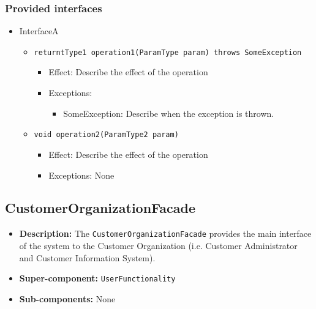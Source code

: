 \documentclass[a4paper,10pt]{article}
\begin{document}
\subsubsection*{Provided interfaces}
\begin{itemize}
    \item InterfaceA
    \begin{itemize}
        \item \texttt{returntType1 operation1(ParamType param) throws SomeException}
        \begin{itemize}
            \item Effect: Describe the effect of the operation
            \item Exceptions:
            \begin{itemize}
                \item SomeException: Describe when the exception is thrown.
            \end{itemize}
		\end{itemize}
		
        \item \texttt{void operation2(ParamType2 param)}
        \begin{itemize}
            \item Effect: Describe the effect of the operation
            \item Exceptions: None
        \end{itemize}  
    \end{itemize}
\end{itemize}

\subsection{CustomerOrganizationFacade}
\begin{itemize}
    \item \textbf{Description:} The \texttt{CustomerOrganizationFacade} provides the main interface of the system to the Customer  Organization (i.e. Customer Administrator and Customer Information System).
    \item \textbf{Super-component:} \texttt{UserFunctionality}
    \item \textbf{Sub-components:} None
\end{itemize}
\end{document}
